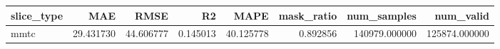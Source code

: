 \begin{tabular}{lrrrrrrr}
\toprule
slice_type & MAE & RMSE & R2 & MAPE & mask_ratio & num_samples & num_valid \\
\midrule
mmtc & 29.431730 & 44.606777 & 0.145013 & 40.125778 & 0.892856 & 140979.000000 & 125874.000000 \\
\bottomrule
\end{tabular}
